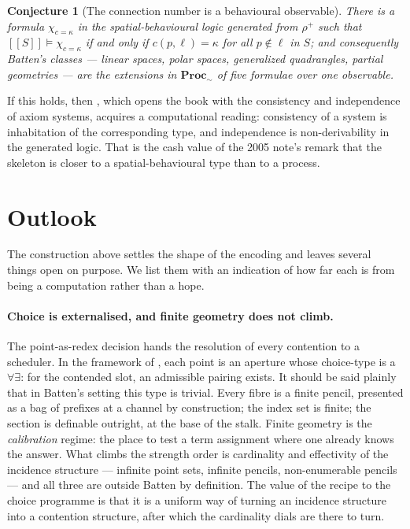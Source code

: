 \documentclass[11pt]{article}
\theoremstyle{plain}
\newtheorem{conjecture}[theorem]{Conjecture}
\theoremstyle{definition}
\theoremstyle{remark}
\newcommand{\enc}[1]{[\![#1]\!]}
\newcommand{\Proc}{\mathbf{Proc}}
\begin{document}
\begin{conjecture}[The connection number is a behavioural observable]
\label{conj:c}
There is a formula $\chi_{c=\kappa}$ in the spatial-behavioural logic generated from
$\rho^{+}$ such that $\enc{S} \models \chi_{c=\kappa}$ if and only if $c(p,\ell) = \kappa$
for all $p \notin \ell$ in $S$; and consequently Batten's classes --- linear spaces, polar
spaces, generalized quadrangles, partial geometries --- are the extensions in
$\Proc_{\sim}$ of five formulae over one observable.
\end{conjecture}

If this holds, then \cite[\S1.1]{Batten}, which opens the book with the consistency and
independence of axiom systems, acquires a computational reading: consistency of a system
is inhabitation of the corresponding type, and independence is non-derivability in the
generated logic. That is the cash value of the 2005 note's remark that the skeleton is
closer to a spatial-behavioural type than to a process.

\section{Outlook}
\label{sec:outlook}

The construction above settles the shape of the encoding and leaves several things open on
purpose. We list them with an indication of how far each is from being a computation
rather than a hope.

\paragraph{Choice is externalised, and finite geometry does not climb.} The point-as-redex
decision hands the resolution of every contention to a scheduler. In the framework of
\cite{Choice}, each point is an aperture whose choice-type is a $\forall\exists$: for the
contended slot, an admissible pairing exists. It should be said plainly that in Batten's
setting this type is trivial. Every fibre is a finite pencil, presented as a bag of
prefixes at a channel by construction; the index set is finite; the section is definable
outright, at the base of the stalk. Finite geometry is the \emph{calibration} regime: the
place to test a term assignment where one already knows the answer. What climbs the
strength order is cardinality and effectivity of the incidence structure --- infinite point
sets, infinite pencils, non-enumerable pencils --- and all three are outside Batten by
definition. The value of the recipe to the choice programme is that it is a uniform way of
turning an incidence structure into a contention structure, after which the cardinality
dials are there to turn.
\end{document}
